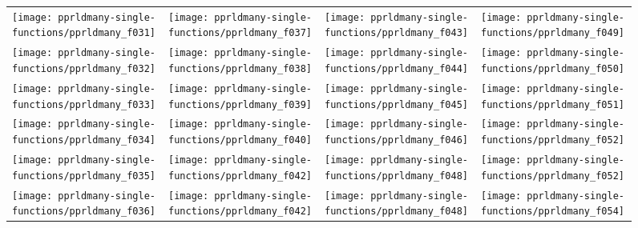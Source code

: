 \documentclass[sigconf]{acmart}
\begin{document}
{%
\begin{figure*}
\centering
\begin{tabular}{l@{\hspace*{-0.00\textwidth}}l@{\hspace*{0.01\textwidth}}l@{\hspace*{-0.00\textwidth}}l}
\texttt{[image: pprldmany-single-functions/pprldmany\_f031]}&
\texttt{[image: pprldmany-single-functions/pprldmany\_f037]}&
\texttt{[image: pprldmany-single-functions/pprldmany\_f043]}&
\texttt{[image: pprldmany-single-functions/pprldmany\_f049]}\\[-0.2em]
\texttt{[image: pprldmany-single-functions/pprldmany\_f032]}&
\texttt{[image: pprldmany-single-functions/pprldmany\_f038]}&
\texttt{[image: pprldmany-single-functions/pprldmany\_f044]}&
\texttt{[image: pprldmany-single-functions/pprldmany\_f050]}\\[-0.2em]
\texttt{[image: pprldmany-single-functions/pprldmany\_f033]}&
\texttt{[image: pprldmany-single-functions/pprldmany\_f039]}&
\texttt{[image: pprldmany-single-functions/pprldmany\_f045]}&
\texttt{[image: pprldmany-single-functions/pprldmany\_f051]}\\[-0.2em]
\texttt{[image: pprldmany-single-functions/pprldmany\_f034]}&
\texttt{[image: pprldmany-single-functions/pprldmany\_f040]}&
\texttt{[image: pprldmany-single-functions/pprldmany\_f046]}&
\texttt{[image: pprldmany-single-functions/pprldmany\_f052]}\\[-0.2em]
\texttt{[image: pprldmany-single-functions/pprldmany\_f035]}&
\texttt{[image: pprldmany-single-functions/pprldmany\_f042]}&
\texttt{[image: pprldmany-single-functions/pprldmany\_f048]}&
\texttt{[image: pprldmany-single-functions/pprldmany\_f052]}\\[-0.2em]
\texttt{[image: pprldmany-single-functions/pprldmany\_f036]}&
\texttt{[image: pprldmany-single-functions/pprldmany\_f042]}&
\texttt{[image: pprldmany-single-functions/pprldmany\_f048]}&
\texttt{[image: pprldmany-single-functions/pprldmany\_f054]}
\vspace*{-1ex}
\end{tabular}
 \caption{\label{fig:ECDFsingleTwo}
}
\end{figure*}

}
\end{document}
